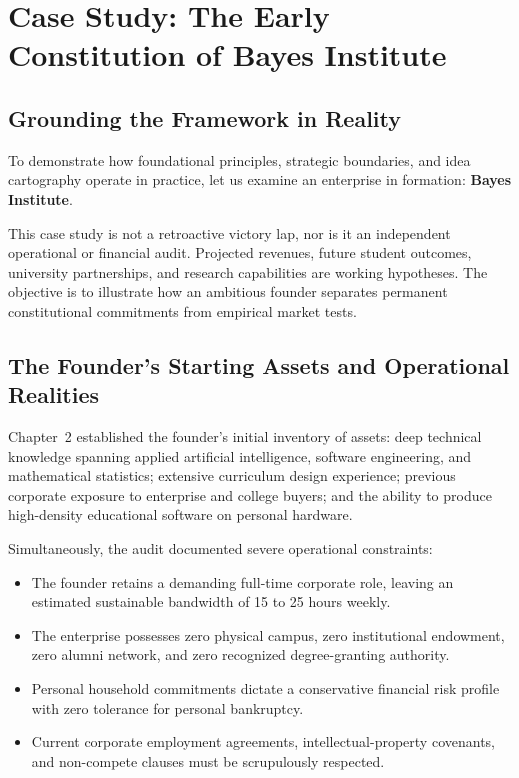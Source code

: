 \section{Case Study: The Early Constitution of Bayes Institute}

\subsection{Grounding the Framework in Reality}

To demonstrate how foundational principles, strategic boundaries, and idea cartography operate in practice, let us examine an enterprise in formation: \textbf{Bayes Institute}.

This case study is not a retroactive victory lap, nor is it an independent operational or financial audit. Projected revenues, future student outcomes, university partnerships, and research capabilities are working hypotheses. The objective is to illustrate how an ambitious founder separates permanent constitutional commitments from empirical market tests.

\subsection{The Founder's Starting Assets and Operational Realities}

Chapter~2 established the founder's initial inventory of assets: deep technical knowledge spanning applied artificial intelligence, software engineering, and mathematical statistics; extensive curriculum design experience; previous corporate exposure to enterprise and college buyers; and the ability to produce high-density educational software on personal hardware.

Simultaneously, the audit documented severe operational constraints:

\begin{itemize}[leftmargin=11pt,itemsep=1.5pt,topsep=1.5pt,parsep=0pt]
  \item The founder retains a demanding full-time corporate role, leaving an estimated sustainable bandwidth of 15 to 25 hours weekly.
  \item The enterprise possesses zero physical campus, zero institutional endowment, zero alumni network, and zero recognized degree-granting authority.
  \item Personal household commitments dictate a conservative financial risk profile with zero tolerance for personal bankruptcy.
  \item Current corporate employment agreements, intellectual-property covenants, and non-compete clauses must be scrupulously respected.
\end{itemize}

